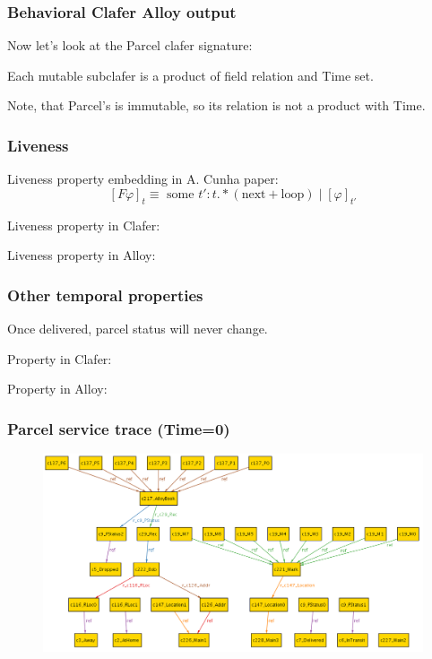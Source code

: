 \documentclass[xcolor=dvipsnames,mathserif,12pt,backend=biber]{beamer}
\begin{document}
  \begin{frame}
    \frametitle{Behavioral Clafer Alloy output}
    Now let's look at the Parcel clafer signature:
    

    Each mutable subclafer is a product of field relation and Time set.
 
    Note, that Parcel's  is immutable, so its relation is not a product with Time.
  \end{frame}
  
  \begin{frame}
    \frametitle{Liveness}
    Liveness property embedding in A. Cunha paper:
    \[
      [F \varphi]_t \equiv \text{ some } t' : t.*(\text{next}+\text{loop} ) \; | \; [\varphi]_{t'}
    \]

    Liveness property in Clafer:
    

    Liveness property in Alloy: 
    
  \end{frame}

  \begin{frame}
    \frametitle{Other temporal properties}
    Once delivered, parcel status will never change.

    Property in Clafer:
    

    Property in Alloy: 
    
  \end{frame}

  \begin{frame}
    \frametitle{Parcel service trace (Time=0)}
\begin{figure}
\includegraphics[width=1.1 \textwidth]{Figures/Shipping_Time0.png}
\end{figure}
  \end{frame}
\end{document}
